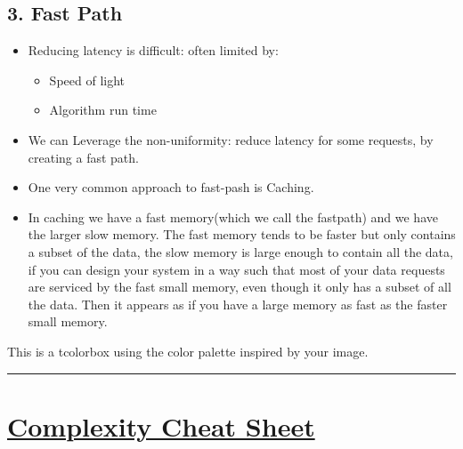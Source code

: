 \documentclass{article}
\begin{document}
\subsection*{3. Fast Path}
\begin{itemize}
    \item Reducing latency is difficult: often limited by:
    \begin{itemize}
        \item Speed of light
        \item Algorithm run time
    \end{itemize}
    \item We can Leverage the non-uniformity: reduce latency for some requests, by creating a fast path.
    \item One very common approach to fast-pash is Caching.
    \item In caching we have a fast memory(which we call the fastpath) and we have the larger slow memory. The fast memory tends to be faster but only contains a subset of the data, the slow memory is large enough to contain all the data, if you can design your system in a way such that most of your data requests are serviced by the fast small memory, even though it only has a subset of all the data. Then it appears as if you have a large memory as fast as the faster small memory.
\end{itemize}



\newpage


\begin{tcolorbox}[
    colback=lightblue,    %
    colframe=darkblue,    %
    coltitle=white,  %
    fonttitle=\bfseries,  %
    title=Digital Circuits
]
This is a tcolorbox using the color palette inspired by your image.
\end{tcolorbox}




\begin{center}
	\rule{450pt}{4pt} 
\end{center}
\newpage

\section*{\centering\underline{Complexity Cheat Sheet}}
\end{document}

